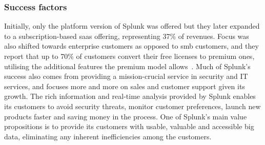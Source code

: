 \subsubsection{Success factors}
Initially, only the platform version of Splunk was offered but they later expanded to a subscription-based \gls{saas} offering, representing 37\% of revenues. Focus was also shifted towards enterprise customers as opposed to \gls{smb} customers, and they report that up to 70\% of customers convert their free licenses to premium ones, utilising the additional features the premium model allows~\cite{philiplay2014}. Much of Splunk's success also comes from providing a mission-crucial service in security and IT services, and focuses more and more on sales and customer support given its growth. The rich information and real-time analysis provided by Splunk enables its customers to avoid security threats, monitor customer preferences, launch new products faster and saving money in the process. One of Splunk's main value propositions is to provide its customers with usable, valuable and accessible big data, eliminating any inherent inefficiencies among the customers. 